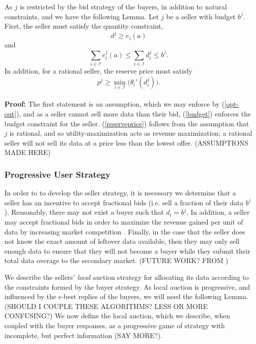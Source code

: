 \documentclass[12pt]{article}
\theoremstyle{definition}
\newcommand{\mcI}{\mathcal{I}}
\begin{document}
\begin{multicols}{2}
As $j$ is restricted by
the bid strategy of the buyers, in addition to natural constraints, and we have the following Lemma.
{
\label{constraints}
Let $j$ be a seller with budget $b^j$.
First, the seller must satisfy the quantity
constraint, 
\begin{equation}\label{quantity}
    d^j \ge e_i(a)
\end{equation}
and
\begin{equation}\label{budget}
    \displaystyle\sum_{i\in\mcI} e_i^j(a) \le \sum_{i\in\mcI} d^j_i \le b^j.
\end{equation}
In addition, for a rational seller, the reserve price must
satisfy 
\begin{equation}\label{reserveprice}
   p^j \ge \min_{i\in\mcI}\big({\theta_i}'(d_i^j)\big).
\end{equation}
}\\
\textbf{Proof:}
The first statement is an assumption, which we may enforce by (\ref{opt-out}),
and as a seller cannot sell more data than their bid, (\ref{budget}) enforces
the budget constraint for the seller. (\ref{reserveprice})
follows from the assumption that $j$ is rational, and so utility-maximization
acts as revenue maximization; a rational seller will not sell its
data at a price less than the lowest offer. (ASSUMPTIONS MADE HERE)


\subsubsection{Progressive User Strategy}
In order to to develop the seller strategy, it is necessary we determine 
that a seller has an incentive to
accept fractional bids (i.e. sell a fraction of their data $b^j$). Reasonably,
there may not exist a buyer such that $d_i = b^j$. In addition, a seller may accept
fractional bids in order to
maximize the revenue gained per unit of data by increasing market competition
\cite{???}.
Finally, in the case that the seller does not know the exact amount of
leftover data available, then they may only sell enough data to ensure that
they will not become a buyer while they submit their total data overage to the
secondary market. (FUTURE WORK? FROM \cite{zheng})

We describe the sellers' \emph{local} auction strategy for allocating its
data according to the constraints formed by the buyer strategy. As
local auction is progressive, and influenced by the $\epsilon$-best replies of
the buyers, we will need the following Lemma. (SHOULD I COUPLE THESE
ALGORITHMS? LESS OR MORE CONFUSING?)
We now define the local auction, which we describe, when coupled with the buyer
responses, as a progressive game of strategy with incomplete, but perfect
information (SAY MORE?).


\end{multicols}
\end{document}
